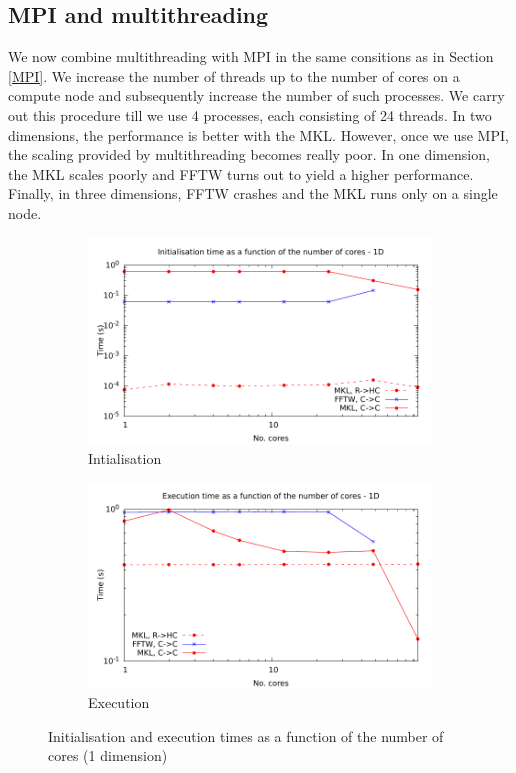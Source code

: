 \documentclass[12pt, a4paper]{article}
\begin{document}
\subsection{MPI and multithreading}\label{MPIMULTH}
We now combine multithreading with MPI in the same consitions as in Section \ref{MPI}. We increase the number of threads up to the number of cores on a compute node and subsequently increase the number of such processes. We carry out this procedure till we use 4 processes, each consisting of 24 threads. In two dimensions, the performance is better with the MKL. However, once we use MPI, the scaling provided by multithreading becomes really poor. In one dimension, the MKL scales poorly and FFTW turns out to yield a higher performance. Finally, in three dimensions, FFTW crashes and the MKL runs only on a single node. 
\begin{figure}[H]
\captionsetup{width=0.8\linewidth}
\centering
\begin{subfigure}{.5\textwidth}
\centering
\includegraphics[width=.9\linewidth]{graphs/mpi-multh-init-1d.pdf}
\caption{Intialisation}
\label{1DMPIMULTHI}
\end{subfigure}%
\begin{subfigure}{.5\textwidth}
\centering
\includegraphics[width=.9\linewidth]{graphs/mpi-multh-exec-1d.pdf}
\caption{Execution}
\label{1DMPIMULTHE}
\end{subfigure}
\caption{Initialisation and execution times as a function of the number of cores (1 dimension)}
\label{1DMPIMULTH}
\end{figure}
\end{document}

